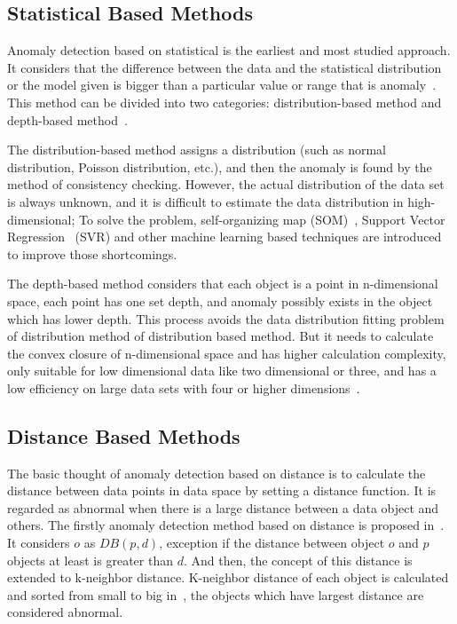 \subsection{Statistical Based Methods}

Anomaly detection based on statistical is the earliest and
most studied approach.
It considers that the difference
between the data and the statistical distribution or the model
given is bigger than a particular value or range that is
anomaly~\cite{chandola2009anomaly}.
This method can be divided into two
categories: distribution-based method and depth-based
method~\cite{wu2016survey}.

The distribution-based method assigns a distribution (such as
normal distribution,
Poisson distribution,
etc.),
and then the anomaly is found by the method of consistency checking.
However,
the actual distribution of the data set is always unknown,
and it is difficult to
estimate the data distribution in high-dimensional;
To solve the problem, 
self-organizing map (SOM)~\cite{siripanadorn2010anomaly}, 
Support Vector Regression~\cite{kromanis2013support} (SVR) and
other machine learning based techniques are introduced to
improve those shortcomings.

The depth-based method considers that
each object is a point in n-dimensional space,
each point has one set depth,
and anomaly possibly exists in the object which has lower depth.
This process avoids the data distribution fitting problem of
distribution method of distribution based method.
But it needs to calculate
the convex closure of n-dimensional space and has higher
calculation complexity,
only suitable for low dimensional
data like two dimensional or three,
and has a low efficiency
on large data sets with four or higher dimensions~\cite{ruts1996computing}.

\subsection{Distance Based Methods}

The basic thought of anomaly detection based on
distance is to calculate the distance between data points in
data space by setting a distance function.
It is regarded as
abnormal when there is a large distance between a data
object and others.
The  firstly anomaly detection method 
based on distance is proposed in~\cite{knorr1997unified}.
It considers $o$ as $DB(p,d)$,
exception if the distance between object $o$ and
$p$ objects at least is greater than $d$.
And then,
the concept of this distance is extended to k-neighbor distance.
K-neighbor distance of each object is calculated and
sorted from small to big in~\cite{ramaswamy2000efficient},
the objects which have largest
distance are considered abnormal.

